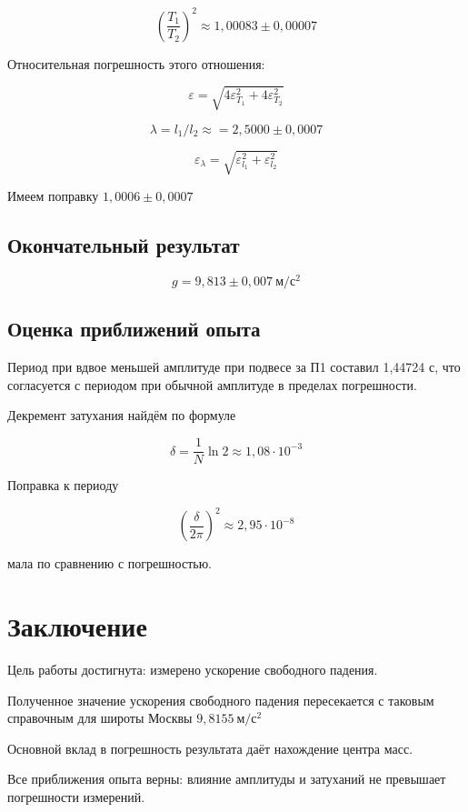 \documentclass{article}
\begin{document}
\begin{equation}
	(\frac{T_1}{T_2})^2 \approx 1,00083 \pm 0,00007
\end{equation}

Относительная погрешность этого отношения:

\begin{equation}
	\varepsilon = \sqrt{4 \varepsilon_{T_1}^2 + 4 \varepsilon_{T_2}^2 }
\end{equation}

\begin{equation}
	\lambda = l_1 / l_2 \approx = 2,5000 \pm 0,0007
\end{equation}

\begin{equation}
	\varepsilon_{\lambda} = \sqrt{\varepsilon_{l_1}^2 + \varepsilon_{ l_2}^2}
\end{equation}

Имеем поправку $1,0006 \pm 0,0007$

\subsection*{Окончательный результат}

\begin{equation}
	\boxed{g = 9,813 \pm 0,007 \ м/с^2}
\end{equation}

\subsection*{Оценка приближений опыта}

Период при вдвое меньшей амплитуде при подвесе за П1 составил 1,44724 с, что согласуется с периодом при обычной амплитуде в пределах погрешности.

Декремент затухания найдём по формуле

\begin{equation}
	\delta = \frac{1}{N} \ln 2 \approx 1,08 \cdot 10^{-3}
\end{equation}

Поправка к периоду

\begin{equation}
	(\frac{\delta}{2\pi})^2 \approx 2,95 \cdot 10^{-8}
\end{equation}

мала по сравнению с погрешностью.

\section*{Заключение}

\hspace{4mm} Цель работы достигнута: измерено ускорение свободного падения. 

Полученное значение ускорения свободного падения пересекается с таковым справочным для широты Москвы $9,8155 \ м/с^2$ 

Основной вклад в погрешность результата даёт нахождение
центра масс.

Все приближения опыта верны: влияние амплитуды и затуханий не превышает погрешности измерений.  
\end{document}

